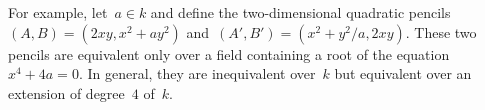 \documentclass{lms}
\begin{document}
% 

For example, let~$a ∈ k$ and define the two-dimensional
quadratic pencils~$(A,B) = (2 x y, x^2 + a y^2)$
and~$(A', B') = (x^2 + y^2/a, 2 x y)$.
These two pencils are equivalent only over a field
containing a root of the equation~$x^4 + 4 a = 0$.
In general, they are inequivalent over~$k$
but equivalent over an extension of degree~$4$ of~$k$.
\end{document}
